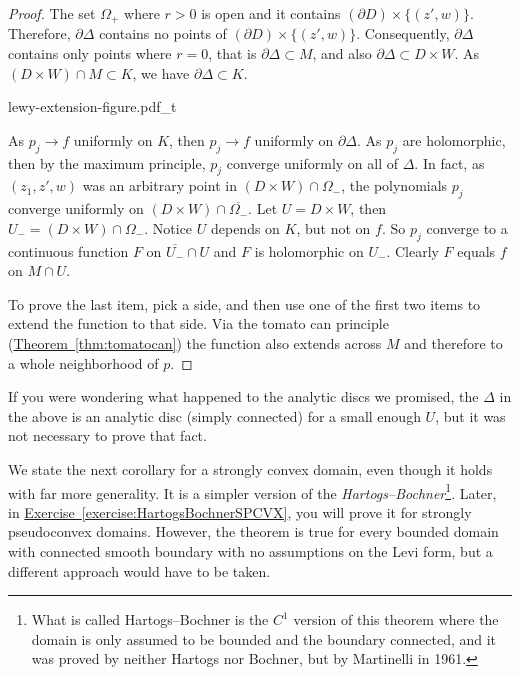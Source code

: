 \documentclass[12pt,openany]{book}
\newcommand{\myindex}[1]{#1\index{#1}}
\theoremstyle{plain}
\theoremstyle{remark}
\theoremstyle{definition}
\newenvironment{myfig}{%
    \begin{center}
}{%
    \end{center}
}
\theoremstyle{exercise}
\theoremstyle{example}
\newcommand{\exerciseref}[1]{\hyperref[#1]{Exercise~\ref*{#1}}}
\newcommand{\thmref}[1]{\hyperref[#1]{Theorem~\ref*{#1}}}
\begin{document}
\begin{proof}
The set $\Omega_+$ where $r > 0$ is open and it contains
$(\partial D) \times \{ (z',w) \}$.  Therefore,
$\partial \Delta$ contains no points of $(\partial D) \times \{ (z',w) \}$.
Consequently, $\partial \Delta$ contains only points where
$r = 0$, that is $\partial \Delta \subset M$, and
also
$\partial \Delta \subset D \times W$.
As $(D \times W) \cap M \subset K$, we have $\partial \Delta \subset K$.

\begin{myfig}
{lewy-extension-figure.pdf_t}
\end{myfig}

As $p_j \to f$ uniformly on $K$, then $p_j \to f$ uniformly on
$\partial \Delta$.  As  $p_j$ are holomorphic, then by the maximum
principle, $p_j$ converge uniformly on all of $\Delta$.  In fact, as $(z_1,z',w)$ was
an arbitrary point in $(D \times W) \cap \Omega_-$,
the polynomials $p_j$ converge uniformly on
$(D \times W) \cap \overline{\Omega_-}$.
Let $U = D \times W$, then $U_- = (D \times W) \cap \Omega_-$.  Notice 
$U$ depends on $K$, but not on $f$.
So $p_j$ converge to a continuous function $F$ on $\overline{U_-} \cap
U$ and $F$
is holomorphic on
$U_-$.  Clearly $F$ equals $f$ on $M \cap U$.

To prove the last item, pick a side, and then use one of the first two
items to extend the function to that side.  Via the tomato can
principle (\thmref{thm:tomatocan}) the function also extends across $M$ and
therefore to a whole neighborhood of $p$.
\end{proof}

If you were wondering what happened to the analytic discs we promised,
the $\Delta$ in the above is an analytic disc (simply connected) for a small enough $U$, but it was
not necessary to prove that fact.

We state the next corollary for a strongly convex domain, even though it
holds with far more generality.
It is a simpler version of the \emph{\myindex{Hartogs--Bochner}}\footnote{What is called
Hartogs--Bochner is 
the $C^1$ version of this theorem where the domain is only assumed to be bounded
and the boundary connected,
and it was proved by neither Hartogs nor
Bochner, but by Martinelli in 1961.}.
Later, in \exerciseref{exercise:HartogsBochnerSPCVX},
you will prove it for strongly pseudoconvex
domains.  However, the theorem is true for every bounded domain with connected smooth
boundary
with no assumptions on the Levi form, but 
a different approach would have to be taken.
\end{document}
